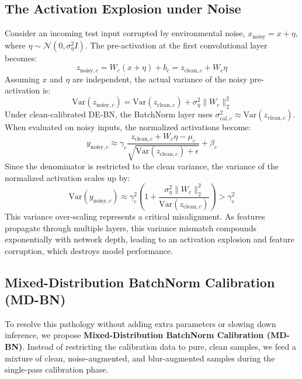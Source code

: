 \documentclass{article}
\theoremstyle{plain}
\theoremstyle{definition}
\theoremstyle{remark}
\begin{document}
\subsection{The Activation Explosion under Noise}
Consider an incoming test input corrupted by environmental noise, $x_{\text{noisy}} = x + \eta$, where $\eta \sim \mathcal{N}(0, \sigma^2_\eta I)$. The pre-activation at the first convolutional layer becomes:
\begin{equation}
    z_{\text{noisy},c} = W_c (x + \eta) + b_c = z_{\text{clean},c} + W_c \eta
\end{equation}
Assuming $x$ and $\eta$ are independent, the actual variance of the noisy pre-activation is:
\begin{equation}
    \text{Var}(z_{\text{noisy},c}) = \text{Var}(z_{\text{clean},c}) + \sigma^2_\eta \|W_c\|^2_2
\end{equation}
Under clean-calibrated DE-BN, the BatchNorm layer uses $\sigma^2_{\text{cal},c} \approx \text{Var}(z_{\text{clean},c})$. When evaluated on noisy inputs, the normalized activations become:
\begin{equation}
    y_{\text{noisy},c} \approx \gamma_c \frac{z_{\text{clean},c} + W_c \eta - \mu_c}{\sqrt{\text{Var}(z_{\text{clean},c}) + \epsilon}} + \beta_c
\end{equation}
Since the denominator is restricted to the clean variance, the variance of the normalized activation scales up by:
\begin{equation}
    \text{Var}(y_{\text{noisy},c}) \approx \gamma^2_c \left(1 + \frac{\sigma^2_\eta \|W_c\|^2_2}{\text{Var}(z_{\text{clean},c})}\right) > \gamma^2_c
\end{equation}
This variance over-scaling represents a critical misalignment. As features propagate through multiple layers, this variance mismatch compounds exponentially with network depth, leading to an activation explosion and feature corruption, which destroys model performance.

\subsection{Mixed-Distribution BatchNorm Calibration (MD-BN)}
To resolve this pathology without adding extra parameters or slowing down inference, we propose \textbf{Mixed-Distribution BatchNorm Calibration (MD-BN)}. Instead of restricting the calibration data to pure, clean samples, we feed a mixture of clean, noise-augmented, and blur-augmented samples during the single-pass calibration phase.
\end{document}
